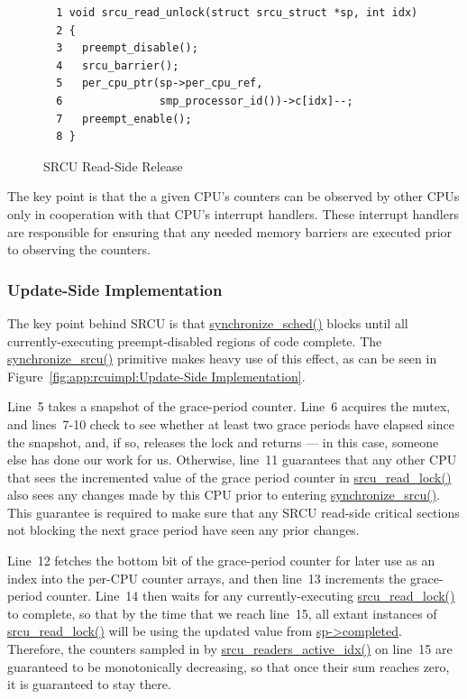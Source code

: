 \begin{figure}[htbp]
{ \scriptsize
\begin{verbatim}
  1 void srcu_read_unlock(struct srcu_struct *sp, int idx)
  2 {
  3   preempt_disable();
  4   srcu_barrier();
  5   per_cpu_ptr(sp->per_cpu_ref,
  6               smp_processor_id())->c[idx]--;
  7   preempt_enable();
  8 }
\end{verbatim}
}
\caption{SRCU Read-Side Release}
\label{fig:app:rcuimpl:Read-Side Release}
\end{figure} 

The key point is that the a given CPU's counters
can be observed by other CPUs only in
cooperation with that CPU's interrupt handlers.
These interrupt handlers are responsible for ensuring that any needed
memory barriers are executed prior to observing the counters.

\subsubsection{Update-Side Implementation}
\label{sec:app:rcuimpl:Update-Side Implementation}

The key point behind SRCU is that \url{synchronize_sched()}
blocks until all currently-executing preempt-disabled regions of
code complete.
The \url{synchronize_srcu()} primitive makes heavy use of this effect,
as can be seen in
Figure~\ref{fig:app:rcuimpl:Update-Side Implementation}.

Line~5 takes a snapshot of the grace-period counter.
Line~6 acquires the mutex, and lines~7-10 check to see whether
at least two grace periods have elapsed since the snapshot,
and, if so, releases the lock and returns --- in this case, someone
else has done our work for us.
Otherwise, line~11 guarantees that any other CPU that sees the
incremented value of the grace period counter in \url{srcu_read_lock()}
also sees any changes made by this CPU prior to entering
\url{synchronize_srcu()}.
This guarantee is required to make sure that any SRCU read-side
critical sections not blocking the next grace period have seen
any prior changes.

Line~12 fetches the bottom bit of the grace-period counter for later
use as an index into the per-CPU counter arrays, and then line~13
increments the grace-period counter.
Line~14 then waits for any currently-executing \url{srcu_read_lock()}
to complete, so that by the time that we reach line~15, all
extant instances of \url{srcu_read_lock()} will be using the updated
value from \url{sp->completed}.
Therefore, the counters sampled in by \url{srcu_readers_active_idx()}
on line~15 are guaranteed to
be monotonically decreasing, so that once their sum reaches zero, it
is guaranteed to stay there.

